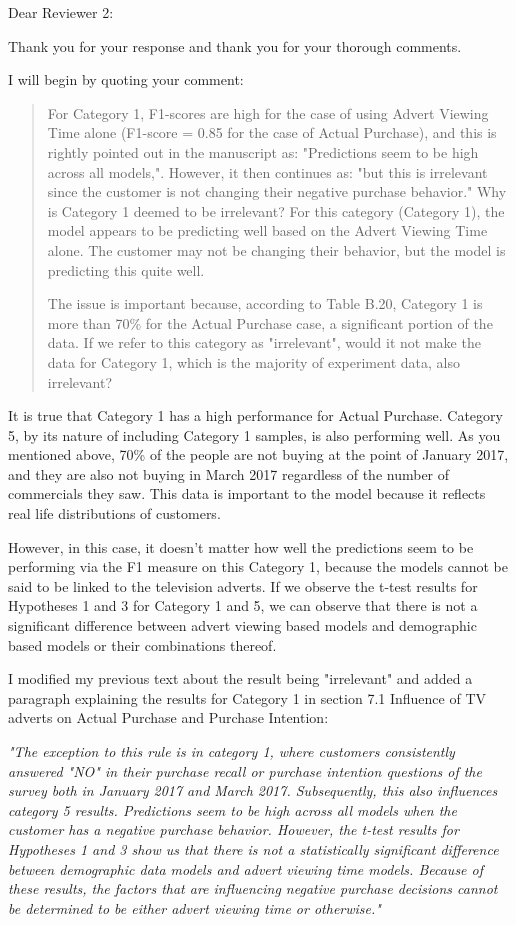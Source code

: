 \documentclass[review]{elsarticle}
\begin{document}
Dear Reviewer 2:

Thank you for your response and thank you for your thorough comments.

I will begin by quoting your comment:

\begin{quotation}
For Category 1, F1-scores are high for the case of using Advert Viewing Time alone (F1-score = 0.85 for the case of Actual Purchase), and this is rightly pointed out in the manuscript as: "Predictions seem to be high across all models,". However, it then continues as: "but this is irrelevant since the customer is not changing their negative purchase behavior." Why is Category 1 deemed to be irrelevant? For this category (Category 1), the model appears to be predicting well based on the Advert Viewing Time alone. The customer may not be changing their behavior, but the model is predicting this quite well. 

The issue is important because, according to Table B.20, Category 1 is more than 70\% for the Actual Purchase case, a significant portion of the data. If we refer to this category as "irrelevant", would it not make the data for Category 1, which is the majority of experiment data, also irrelevant?
\end{quotation}

It is true that Category 1 has a high performance for Actual Purchase. Category 5, by its nature of including Category 1 samples, is also performing well. As you mentioned above, 70\% of the people are not buying at the point of January 2017, and they are also not buying in March 2017 regardless of the number of commercials they saw. This data is important to the model because it reflects real life distributions of customers. 

However, in this case, it doesn't matter how well the predictions seem to be performing via the F1 measure on this Category 1, because the models cannot be said to be linked to the television adverts. If we observe the t-test results for Hypotheses 1 and 3 for Category 1 and 5, we can observe that there is not a significant difference between advert viewing based models and demographic based models or their combinations thereof.

I modified my previous text about the result being "irrelevant" and added a paragraph explaining the results for Category 1 in section 7.1 Influence of TV adverts on Actual Purchase and Purchase Intention:

\textit{"The exception to this rule is in category 1, where customers consistently answered "NO" in their purchase recall or purchase intention questions of the survey both in January 2017 and March 2017. Subsequently, this also influences category 5 results. Predictions seem to be high across all models when the customer has a negative purchase behavior. However, the t-test results for Hypotheses 1 and 3 show us that there is not a statistically significant difference between demographic data models and advert viewing time models. Because of these results, the factors that are influencing negative purchase decisions cannot be determined to be either advert viewing time or otherwise."}
\end{document}

